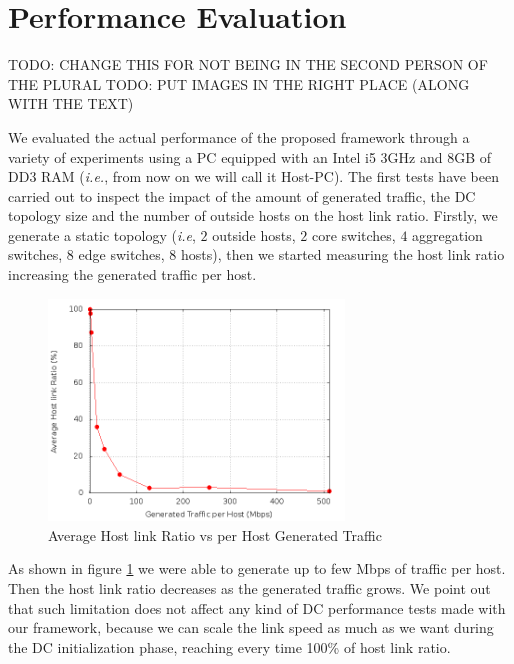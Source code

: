 \documentclass[12pt,english,oneside]{book}
\begin{document}
\section{Performance Evaluation}
\label{sec:perf}
\hspace{0.6cm}

TODO: CHANGE THIS FOR NOT BEING IN THE SECOND PERSON OF THE PLURAL
TODO: PUT IMAGES IN THE RIGHT PLACE (ALONG WITH THE TEXT)

We evaluated the actual performance of the proposed framework through a variety of experiments using a PC equipped with an Intel i5 3GHz and 8GB of DD3 RAM (\textit{i.e.}, from now on we will call it Host-PC).
The first tests have been carried out to inspect the impact of the amount of generated traffic, the DC topology size and the number of outside hosts on the host link ratio.
Firstly, we generate a static topology (\textit{i.e}, $2$ outside hosts, $2$ core switches, $4$ aggregation switches, $8$ edge switches, $8$ hosts), then we started measuring the host link ratio increasing the generated traffic per host.

\begin{figure}[h!tbp]
        \centering
        \includegraphics[width=0.7\textwidth]{figures/bw_utilization.png}
        \caption{Average Host link Ratio vs per Host Generated Traffic}
        \label{fig:bw}
\end{figure}

As shown in figure \ref{fig:bw} we were able to generate up to few Mbps of traffic per host.
Then the host link ratio decreases as the generated traffic grows.
We point out that such limitation does not affect any kind of DC performance tests made with our framework,
because we can scale the link speed as much as we want during the DC initialization phase, reaching every time 100\% of host link ratio.
\end{document}
